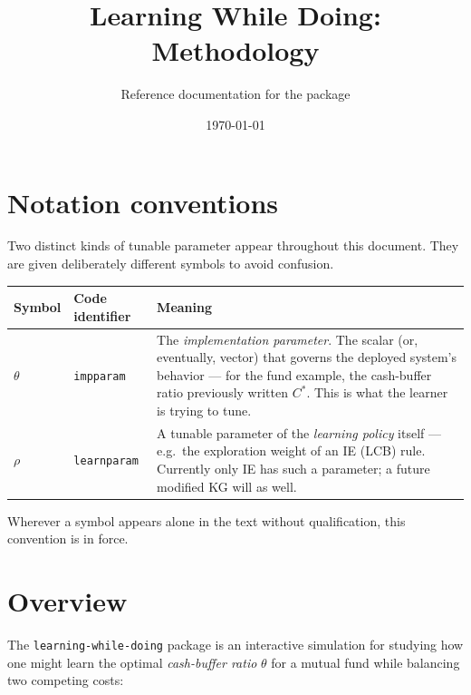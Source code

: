 \documentclass[11pt]{article}
\title{Learning While Doing: Methodology}
\author{Reference documentation for the \code{learning-while-doing} package}
\date{\today}
\newcommand{\Cstar}{\theta}
\newcommand{\code}[1]{\texttt{#1}}
\begin{document}
\maketitle
\tableofcontents
\bigskip

\section*{Notation conventions}

Two distinct kinds of tunable parameter appear throughout this document.
They are given deliberately different symbols to avoid confusion.

\begin{center}\small
\begin{tabular}{@{}p{2.5cm}p{3.5cm}p{9.5cm}@{}}
  \toprule
  Symbol & Code identifier & Meaning \\
  \midrule
  $\theta$ & \code{impparam} &
    The \emph{implementation parameter}. The scalar (or, eventually, vector)
    that governs the deployed system's behavior — for the fund example,
    the cash-buffer ratio previously written $C^{*}$. This is what the
    learner is trying to tune. \\[3pt]
  $\rho$   & \code{learnparam} &
    A tunable parameter of the \emph{learning policy} itself — e.g.\
    the exploration weight of an IE (LCB) rule. Currently only IE has
    such a parameter; a future modified KG will as well. \\
  \bottomrule
\end{tabular}
\end{center}

Wherever a symbol appears alone in the text without qualification, this
convention is in force.

\section{Overview}

The \code{learning-while-doing} package is an interactive simulation for
studying how one might learn the optimal \emph{cash-buffer ratio} $\Cstar$
for a mutual fund while balancing two competing costs:
\end{document}
